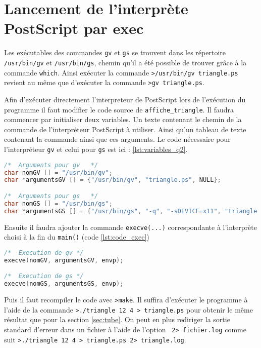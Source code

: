 \section{Lancement de l'interprète PostScript par exec}

Les exécutables des commandes \verb!gv! et \verb!gs! se trouvent dans les répertoire \verb!/usr/bin/gv! et \verb!/usr/bin/gs!, chemin qu'il a été possible de trouver grâce à la commande \verb!which!.
Ainsi exécuter la commande \verb!>/usr/bin/gv triangle.ps! revient au même que d'exécuter la commande \verb!>gv triangle.ps!.

Afin d'exécuter directement l'interpreteur de PostScript lors de l'exécution du programme il faut modifier le code source de \verb!affiche_triangle!.
Il faudra commencer par initialiser deux variables. Un texte contenant le chemin de la commande de l'interpréteur PostScript à utiliser. Ainsi qu'un tableau de texte contenant la commande ainsi que ces arguments. Le code nécessaire pour l'interpréteur \verb!gv! et celui pour \verb!gs! est ici : \ref{lst:variables_q2}.

\begin{lstlisting}[language=C, label={lst:variables_q2}, caption=Initialisation des variables pour exec de gv et gs]
/*	Arguments pour gv	*/
char nomGV [] = "/usr/bin/gv";
char *argumentsGV [] = {"/usr/bin/gv", "triangle.ps", NULL};

/*  Arguments pour gs	*/
char nomGS [] = "/usr/bin/gs";
char *argumentsGS [] = {"/usr/bin/gs", "-q", "-sDEVICE=x11", "triangle.ps", NULL};
\end{lstlisting}

Ensuite il faudra ajouter la commande \verb!execve(...)! correspondante à l'interprète choisi à la fin du \verb!main()! (code \ref{lst:code_exec})

\begin{lstlisting}[language=C, label={lst:code_exec}, caption=Appel de la fonction execve() pour gv et gs]
/*  Execution de gv	*/
execve(nomGV, argumentsGV, envp);

/*  Execution de gs	*/
execve(nomGS, argumentsGS, envp);
\end{lstlisting}

Puis il faut recompiler le code avec \verb!>make!. Il suffira d'exécuter le programme à l'aide de la commande \verb!>./triangle 12 4 > triangle.ps! pour obtenir le même résultat que pour la section \ref{sec:tube}. On peut en plus rediriger la sortie standard d'erreur dans un fichier à l'aide de l'option \verb! 2> fichier.log! comme suit \verb!>./triangle 12 4 > triangle.ps 2> triangle.log!.

